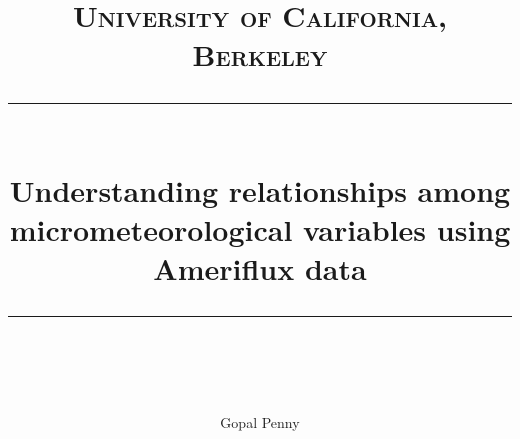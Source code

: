 %
%
\usepackage[english]{babel}
\usepackage{graphicx}
\usepackage{epstopdf}
\usepackage{fullpage}
\usepackage{natbib}
\usepackage{amsmath}
\usepackage{lineno}
\usepackage{longtable}
\usepackage{multirow}
\usepackage{lscape}
\usepackage{rotating}
\usepackage{url}
\linespread{1}
\usepackage[T1]{fontenc}
\usepackage{mathptmx}
\usepackage{multicol}
\usepackage{amsfonts}
\usepackage{listings}
\usepackage[usenames,dvipsnames]{color}




\newcommand{\FIX}[1]{{\color{magenta} [{\bfseries #1}] }}
\newcommand{\NEW}[1]{{\color{green} #1 }}

\newcommand{\horrule}[1]{\rule{\linewidth}{#1}} %

\title{	
\normalfont \normalsize 
\textsc{University of California, Berkeley} \\ [25pt] %
\horrule{0.5pt} \\[0.2cm] %
\huge Understanding relationships among micrometeorological variables using Ameriflux data \\ %
\horrule{0.5pt} \\[0.1cm] %
}

\author{Gopal Penny}


\maketitle


\thispagestyle{empty}


\normalsize

%
%
%
%

